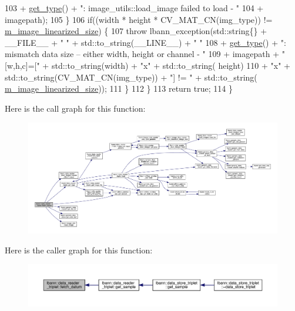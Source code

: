 \begin{DoxyCode}
103                             + \hyperlink{classlbann_1_1data__reader__triplet_a7ff627eed9a4671129cbf7fb9ca11871}{get\_type}() + \textcolor{stringliteral}{": image\_utils::load\_image failed to load - "}
104                             + imagepath);
105     \}
106     \textcolor{keywordflow}{if}((width * height * CV\_MAT\_CN(img\_type)) != \hyperlink{classlbann_1_1image__data__reader_af512f1f866c0f654309b7f28886dca9a}{m\_image\_linearized\_size}) \{
107       \textcolor{keywordflow}{throw} lbann\_exception(std::string\{\} + \_\_FILE\_\_ + \textcolor{stringliteral}{" "} + std::to\_string(\_\_LINE\_\_) + \textcolor{stringliteral}{" "}
108                             + \hyperlink{classlbann_1_1data__reader__triplet_a7ff627eed9a4671129cbf7fb9ca11871}{get\_type}() + \textcolor{stringliteral}{": mismatch data size -- either width, height or channel
       - "}
109                             + imagepath + \textcolor{stringliteral}{" [w,h,c]=["} + std::to\_string(width) + \textcolor{stringliteral}{"x"} + std::to\_string(
      height)
110                             + \textcolor{stringliteral}{"x"} + std::to\_string(CV\_MAT\_CN(img\_type)) + \textcolor{stringliteral}{"] != "} + std::to\_string(
      \hyperlink{classlbann_1_1image__data__reader_af512f1f866c0f654309b7f28886dca9a}{m\_image\_linearized\_size}));
111     \}
112   \}
113   \textcolor{keywordflow}{return} \textcolor{keyword}{true};
114 \}
\end{DoxyCode}
Here is the call graph for this function\+:\nopagebreak
\begin{figure}[H]
\begin{center}
\leavevmode
\includegraphics[width=350pt]{classlbann_1_1data__reader__triplet_af3f41e46bef2fbd3e19d545fa27f11ce_cgraph}
\end{center}
\end{figure}
Here is the caller graph for this function\+:\nopagebreak
\begin{figure}[H]
\begin{center}
\leavevmode
\includegraphics[width=350pt]{classlbann_1_1data__reader__triplet_af3f41e46bef2fbd3e19d545fa27f11ce_icgraph}
\end{center}
\end{figure}
